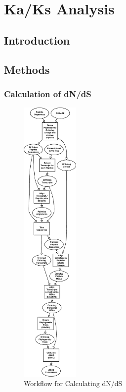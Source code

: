 \section{Ka/Ks Analysis}

\subsection{Introduction}

\subsection{Methods}

\subsubsection{Calculation of dN/dS}

\begin{figure}[H]
  \centering
  \includegraphics[width=0.25\textwidth]{figures/ka_ks/PAML_workflow}
  \caption{Workflow for Calculating dN/dS}
  \label{fig:ka-ks-workflow}
\end{figure}

